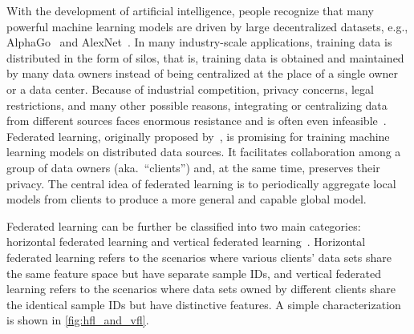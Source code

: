 With the development of artificial intelligence, people recognize that many powerful machine learning models are driven by large decentralized datasets, e.g., AlphaGo~\citep{silver2016mastering} and AlexNet~\citep{krizhevsky2012imagenet}. In many industry-scale applications, training data is distributed in the form of silos, that is, training data is obtained and maintained by many data owners instead of being centralized at the place of a single owner or a data center. Because of industrial competition, privacy concerns, legal restrictions, and many other possible reasons, integrating or centralizing data from different sources faces enormous resistance and is often even infeasible~\citep{li2020review}. Federated learning, originally proposed by~\citet{federated2016}, is promising for training machine learning models on distributed data sources. It facilitates collaboration among a group of data owners (aka.~``clients'') and, at the same time, preserves their privacy. The central idea of federated learning is to periodically aggregate local models from clients to produce a more general and capable global model.

Federated learning can be further be classified into two main categories: horizontal federated learning and vertical federated learning~\cite{yang2019federated}. Horizontal federated learning refers to the scenarios where various clients' data sets share the same feature space but have separate sample IDs, and vertical federated learning refers to the scenarios where data sets owned by different clients share the identical sample IDs but have distinctive features. A simple characterization is shown in \autoref{fig:hfl_and_vfl}. 

